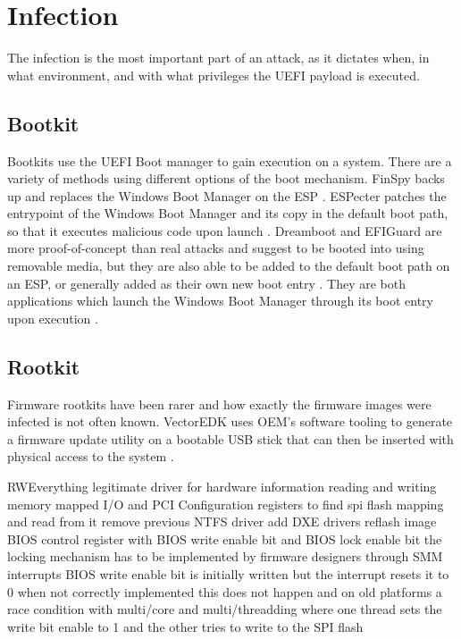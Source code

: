 \section{Infection}

The infection is the most important part of an attack, as it dictates when, in what environment, and with what privileges the \ac{UEFI} payload is executed.

\subsection{Bootkit}

Bootkits use the \ac{UEFI} Boot manager to gain execution on a system.
There are a variety of methods using different options of the boot mechanism.
FinSpy backs up and replaces the Windows Boot Manager  on the \ac{ESP} \cite{finspy}.
ESPecter patches the entrypoint of the Windows Boot Manager  and its copy  in the default boot path, so that it executes malicious code upon launch \cite{especter}.
Dreamboot and EFIGuard are more proof-of-concept than real attacks and suggest to be booted into using removable media, but they are also able to be added to the default boot path on an \ac{ESP}, or generally added as their own new boot entry \cite{efiguard}.
They are both applications which launch the Windows Boot Manager through its boot entry upon execution \cite{dreamboot, efiguard}.

\subsection{Rootkit}

Firmware rootkits have been rarer and how exactly the firmware images were infected is not often known.
VectorEDK uses \ac{OEM}'s software tooling to generate a firmware update utility on a bootable \ac{USB} stick that can then be inserted with physical access to the system \cite{mosaicregressor}.


RWEverything legitimate driver for hardware information
        reading and writing memory mapped \ac{I/O} and \ac{PCI} Configuration registers
        to find spi flash mapping and read from it
        remove previous NTFS driver
        add DXE drivers
        reflash image
        \ac{BIOS} control register with \ac{BIOS} write enable bit and \ac{BIOS} lock enable bit
        the locking mechanism has to be implemented by firmware designers through \ac{SMM} interrupts
        \ac{BIOS} write enable bit is initially written but the interrupt resets it to 0
        when not correctly implemented this does not happen
        and on old platforms a race condition with multi\-/core and multi\-/threadding
        where one thread sets the write bit enable to 1 and the other tries to write to the \ac{SPI} flash
        \cite{lojax}

